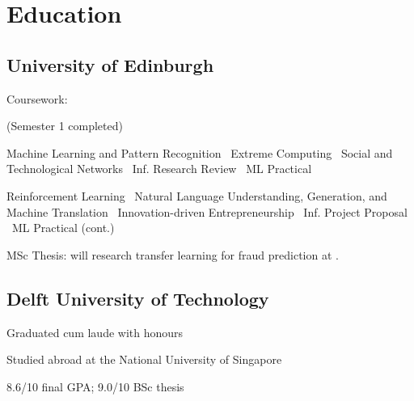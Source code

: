 \documentclass[]{deedy-resume-openfont}
\begin{document}

%
%

%
%
\begin{minipage}[t]{0.32\textwidth} 

\section{Education} 

\subsection{University of Edinburgh}

\vspace{0.2\topsep}
Coursework: \begin{small}(Semester 1 completed)
\vspace{0.2\topsep}

Machine Learning and Pattern Recognition \textbullet \
Extreme Computing \textbullet \
Social and Technological Networks \textbullet \
Inf. Research Review \textbullet \
ML Practical
\vspace{0.3\topsep}

\custombold{Semester 2:}
Reinforcement Learning \textbullet \
Natural Language Understanding, Generation, and Machine Translation \textbullet \
Innovation-driven Entrepreneurship \textbullet \
Inf. Project Proposal \textbullet \
ML Practical (cont.)
\vspace{0.3\topsep}

\custombold{Summer:}
MSc Thesis: will research transfer learning for fraud prediction at \href{https://www.adyen.com/}{}.

\end{small}
\vspace{\topsep}

\subsection{Delft University of \newline Technology}
\vspace{\topsep}
\begin{tightemize}
    \item Graduated cum laude with honours
    \item Studied abroad at the National University of Singapore
    \item 8.6/10 final GPA; 9.0/10 BSc thesis
\end{tightemize}


\end{minipage}
\end{document}
